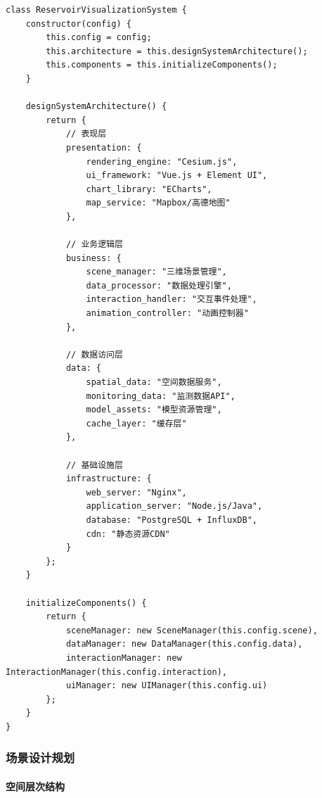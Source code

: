 \begin{lstlisting}
class ReservoirVisualizationSystem {
    constructor(config) {
        this.config = config;
        this.architecture = this.designSystemArchitecture();
        this.components = this.initializeComponents();
    }
    
    designSystemArchitecture() {
        return {
            // 表现层
            presentation: {
                rendering_engine: "Cesium.js",
                ui_framework: "Vue.js + Element UI",
                chart_library: "ECharts",
                map_service: "Mapbox/高德地图"
            },
            
            // 业务逻辑层
            business: {
                scene_manager: "三维场景管理",
                data_processor: "数据处理引擎", 
                interaction_handler: "交互事件处理",
                animation_controller: "动画控制器"
            },
            
            // 数据访问层
            data: {
                spatial_data: "空间数据服务",
                monitoring_data: "监测数据API",
                model_assets: "模型资源管理",
                cache_layer: "缓存层"
            },
            
            // 基础设施层
            infrastructure: {
                web_server: "Nginx",
                application_server: "Node.js/Java",
                database: "PostgreSQL + InfluxDB",
                cdn: "静态资源CDN"
            }
        };
    }
    
    initializeComponents() {
        return {
            sceneManager: new SceneManager(this.config.scene),
            dataManager: new DataManager(this.config.data),
            interactionManager: new InteractionManager(this.config.interaction),
            uiManager: new UIManager(this.config.ui)
        };
    }
}
\end{lstlisting}

\subsubsection{场景设计规划}\label{ux573aux666fux8bbeux8ba1ux89c4ux5212}

\paragraph{空间层次结构}\label{ux7a7aux95f4ux5c42ux6b21ux7ed3ux6784}

